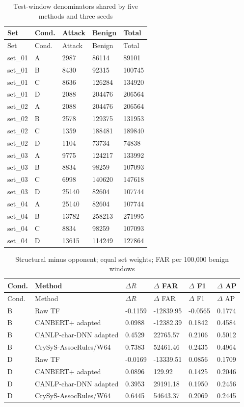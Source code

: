 \documentclass[12pt,a4paper,oneside,openany]{extbook}
\begin{document}
\begin{longtable}{P{2.0cm}P{1.2cm}P{2.7cm}P{2.7cm}P{2.7cm}}
\caption{Test-window denominators shared by five methods and three seeds}\label{tab:comparison-counts}\\\toprule
Set & Cond. & Attack & Benign & Total\\\midrule\endfirsthead
\toprule
Set & Cond. & Attack & Benign & Total\\\midrule\endhead
set\_01 & A & 2987 & 86114 & 89101\\
set\_01 & B & 8430 & 92315 & 100745\\
set\_01 & C & 8636 & 126284 & 134920\\
set\_01 & D & 2088 & 204476 & 206564\\
set\_02 & A & 2088 & 204476 & 206564\\
set\_02 & B & 2578 & 129375 & 131953\\
set\_02 & C & 1359 & 188481 & 189840\\
set\_02 & D & 1104 & 73734 & 74838\\
set\_03 & A & 9775 & 124217 & 133992\\
set\_03 & B & 8834 & 98259 & 107093\\
set\_03 & C & 6998 & 140620 & 147618\\
set\_03 & D & 25140 & 82604 & 107744\\
set\_04 & A & 25140 & 82604 & 107744\\
set\_04 & B & 13782 & 258213 & 271995\\
set\_04 & C & 8834 & 98259 & 107093\\
set\_04 & D & 13615 & 114249 & 127864\\
\bottomrule\end{longtable}
\begin{longtable}{P{1.2cm}P{4.0cm}P{1.7cm}P{2.2cm}P{1.7cm}P{1.7cm}}
\caption{Structural minus opponent; equal set weights; FAR per 100,000 benign windows}\label{tab:comparison-paired}\\\toprule
Cond. & Method & $\Delta R$ & $\Delta$ FAR & $\Delta$ F1 & $\Delta$ AP\\\midrule\endfirsthead
\toprule
Cond. & Method & $\Delta R$ & $\Delta$ FAR & $\Delta$ F1 & $\Delta$ AP\\\midrule\endhead
B & Raw TF & -0.1159 & -12839.95 & -0.0565 & 0.1774\\
B & CANBERT+ adapted & 0.0988 & -12382.39 & 0.1842 & 0.4584\\
B & CANLP-char-DNN adapted & 0.4529 & 22765.57 & 0.2106 & 0.5012\\
B & CrySyS-AssocRules/W64 & 0.7383 & 52461.46 & 0.2435 & 0.4964\\
D & Raw TF & -0.0169 & -13339.51 & 0.0856 & 0.1709\\
D & CANBERT+ adapted & 0.0896 & 129.92 & 0.1425 & 0.2046\\
D & CANLP-char-DNN adapted & 0.3953 & 29191.18 & 0.1950 & 0.2456\\
D & CrySyS-AssocRules/W64 & 0.6445 & 54643.37 & 0.2069 & 0.2445\\
\bottomrule\end{longtable}
\end{document}
